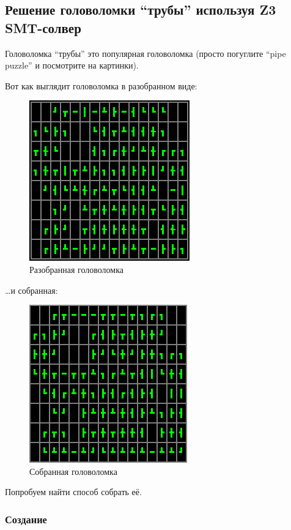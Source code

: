 \subsection{Решение головоломки ``трубы'' используя Z3 SMT-солвер}

Головоломка ``трубы'' это популярная головоломка (просто погуглите ``pipe puzzle'' и посмотрите на картинки).

Вот как выглядит головоломка в разобранном виде:

\begin{figure}[H]
\label{fig:pipe_shuffled}
\centering
\includegraphics[scale=0.75]{SMT/pipe/shuffled.png}
\caption{Разобранная головоломка}
\end{figure}

\dots и собранная:

\begin{figure}[H]
\label{fig:pipe_solved}
\centering
\includegraphics[scale=0.75]{SMT/pipe/solved.png}
\caption{Собранная головоломка}
\end{figure}

Попробуем найти способ собрать её.

\subsubsection{Создание}

